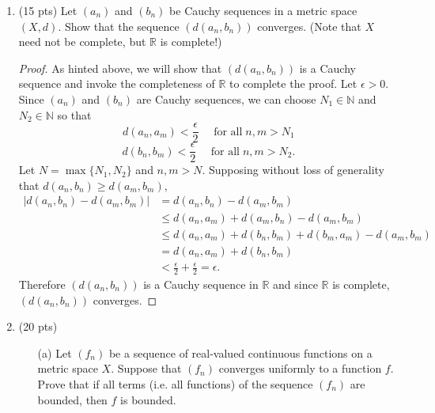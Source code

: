 \documentclass[12pt,twoside]{article}
\newcommand{\back}{\noindent ($\Longleftarrow$) \,\,}
\newcommand{\R}{\mathbb R} %
\newcommand{\N}{\mathbb N} %
\begin{document}
\begin{enumerate}
\begin{proof}
\back Conversely suppose that all functions on $X$ are continuous. Let $a\in X$ and define the function $f_a:X\to\R$ by
$$f_a(x) = \begin{cases} 64 & \text{ if } x=a\\
					0 & \text{ if }  x\ne a \end{cases} $$
Note that the open interval $(63,65) = B_1(64)$ is an open subset of $\R$. Since $f_a$ is continuous by hypothesis, Theorem 4.3.5 guarantees that the inverse image of $(63,65)$ is open in $X$. By the construction above we have $$f_a^{-1}\left((63,65)\right) = \{a\},$$ so the previous sentence implies that $\{a\}$ is open in $X$. Since $a$ was arbitrary, we conclude $X$ is a discrete metric space.
\end{proof}


\item (15 pts) Let $(a_n)$ and $(b_n)$ be Cauchy sequences in a metric space $(X,d)$.  Show that the sequence $(d(a_n, b_n))$ converges.  (Note that $X$ need not be complete, but $\R$ is complete!)

\begin{proof} As hinted above, we will show that $(d(a_n, b_n))$ is a Cauchy sequence and invoke the completeness of $\R$ to complete the proof. Let $\epsilon>0$. Since $(a_n)$ and $(b_n)$ are Cauchy sequences, we can choose $N_1\in\N$ and $N_2\in\N$ so that 
$$d(a_n,a_m)<\frac{\epsilon}{2}\quad\text{ for all}\; n,m>N_1$$
$$d(b_n,b_m)<\frac{\epsilon}{2}\quad\text{ for all}\; n,m>N_2.$$ Let $N=\max\{N_1,N_2\}$ and $n,m>N$. Supposing without loss of generality that $d(a_n,b_n)\ge d(a_m,b_m)$,
\begin{align*} \left| d(a_n,b_n) - d(a_m,b_m)\right| &= d(a_n,b_n) - d(a_m,b_m)\\
										&\le  d(a_n,a_m) + d(a_m,b_n) - d(a_m,b_m)\\
							&\le d(a_n,a_m) + d(b_n,b_m) +d(b_m,a_m) - d(a_m,b_m)\\
									&=d(a_n,a_m) + d(b_n,b_m) \\
									&<\frac{\epsilon}{2}+\frac{\epsilon}{2} = \epsilon.\end{align*} Therefore $(d(a_n,b_n))$ is a Cauchy sequence in $\R$ and since $\R$ is complete, $(d(a_n,b_n))$ converges.\end{proof}

\item (20 pts)
\begin{itemize}
\item[(a)] Let $(f_n)$ be a sequence of real-valued continuous
functions on a metric space $X$.  Suppose that $(f_n)$ converges
uniformly to a function $f$.  Prove that if all terms (i.e. all
functions) of the sequence $(f_n)$ are bounded, then $f$ is
bounded.


\end{itemize}
\end{enumerate}
\end{document}
